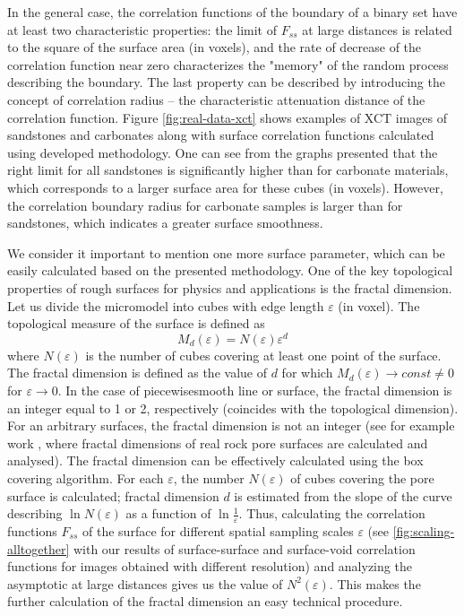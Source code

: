 \documentclass[reprint,amsmath,amssymb,aps,pre,showkeys,showpacs]{revtex4-1}
\begin{document}
In the general case, the correlation functions of the boundary of a binary set
have at least two characteristic properties: the limit of $F_{ss}$ at large
distances is related to the square of the surface area (in voxels), and the rate
of decrease of the correlation function near zero characterizes the "memory" of
the random process describing the boundary. The last property can be described
by introducing the concept of correlation radius -- the characteristic
attenuation distance of the correlation function. Figure \ref{fig:real-data-xct}
shows examples of XCT images of sandstones and carbonates along with surface
correlation functions calculated using developed methodology.  One can see from
the graphs presented that the right limit for all sandstones is significantly
higher than for carbonate materials, which corresponds to a larger surface area
for these cubes (in voxels). However, the correlation boundary radius for
carbonate samples is larger than for sandstones, which indicates a greater
surface smoothness.

We consider it important to mention one more surface parameter, which can be
easily calculated based on the presented methodology. One of the key topological
properties of rough surfaces for physics and applications is the fractal
dimension. Let us divide the micromodel into cubes with edge length
$\varepsilon$ (in voxel). The topological measure of the surface is defined as
\begin{equation*}
  M_d(\varepsilon) = N(\varepsilon) \varepsilon^d
\end{equation*}
where $N(\varepsilon)$ is the number of cubes covering at least one point of the
surface. The fractal dimension is defined as the value of $d$ for which
$M_d(\varepsilon) \rightarrow const \ne 0$ for $\varepsilon \rightarrow 0$. In
the case of piecewisesmooth line or surface, the fractal dimension is an integer
equal to 1 or 2, respectively (coincides with the topological dimension). For an
arbitrary surfaces, the fractal dimension is not an integer (see for example
work \cite{khlyupin2015fractal}, where fractal dimensions of real rock pore
surfaces are calculated and analysed). The fractal dimension can be effectively
calculated using the box covering algorithm. For each $\varepsilon$, the number
$N(\varepsilon)$ of cubes covering the pore surface is calculated; fractal
dimension $d$ is estimated from the slope of the curve describing
$\ln N(\varepsilon)$ as a function of $\ln \frac{1}{\varepsilon}$. Thus,
calculating the correlation functions $F_{ss}$ of the surface for different
spatial sampling scales $\varepsilon$ (see \cref{fig:scaling-alltogether} with
our results of surface-surface and surface-void correlation functions for images
obtained with different resolution) and analyzing the asymptotic at large
distances gives us the value of $N^2(\varepsilon)$. This makes the further
calculation of the fractal dimension an easy technical procedure.
\end{document}
